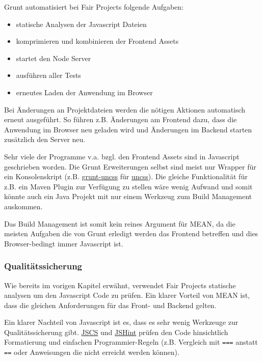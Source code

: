 Grunt automatisiert bei Fair Projects folgende Aufgaben:

\begin{itemize}
\itemsep1pt\parskip0pt
\item
  statische Analysen der Javascript Dateien
\item
  komprimieren und kombinieren der Frontend Assets
\item
  startet den Node Server
\item
  ausführen aller Tests
\item
  erneutes Laden der Anwendung im Browser
\end{itemize}

Bei Änderungen an Projektdateien werden die nötigen Aktionen automatisch
erneut ausgeführt. So führen z.B. Änderungen am Frontend dazu, dass die
Anwendung im Browser neu geladen wird und Änderungen im Backend starten
zusätzlich den Server neu.

Sehr viele der Programme v.a. bzgl. den Frontend Assets sind in
Javascript geschrieben worden. Die Grunt Erweiterungen selbst sind meist
nur Wrapper für ein Konsolenskript (z.B.
\href{https://github.com/addyosmani/grunt-uncss}{grunt-uncss} für
\href{https://github.com/giakki/uncss}{uncss}). Die gleiche
Funktionalität für z.B. ein Maven Plugin zur Verfügung zu stellen wäre
wenig Aufwand und somit könnte auch ein Java Projekt mit nur einem
Werkzeug zum Build Management auskommen.

Das Build Management ist somit kein reines Argument für MEAN, da die
meisten Aufgaben die von Grunt erledigt werden das Frontend betreffen
und dies Browser-bedingt immer Javascript ist.

\subsubsection{Qualitätssicherung}\label{qualituxe4tssicherung}

Wie bereits im vorigen Kapitel erwähnt, verwendet Fair Projects
statische analysen um den Javascript Code zu prüfen. Ein klarer Vorteil
von MEAN ist, dass die gleichen Anforderungen für das Front- und Backend
gelten.

Ein klarer Nachteil von Javascript ist es, dass es sehr wenig Werkzeuge
zur Qualitätssicherung gibt. \href{http://jscs.info/}{JSCS} und
\href{http://jshint.com/}{JSHint} prüfen den Code hinsichtlich
Formatierung und einfachen Programmier-Regeln (z.B. Vergleich mit
\texttt{===} anstatt \texttt{==} oder Anweisungen die nicht erreicht
werden können).

